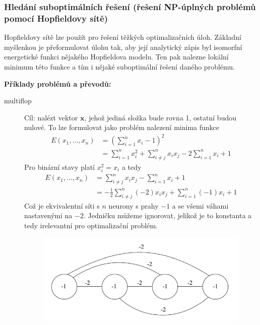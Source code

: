 \documentclass[11pt]{report} %
\renewcommand{\vec}[1]{\mathbf{#1}}
\numberwithin{equation}{section}
\begin{document}
\subsubsection{Hledání suboptimálních řešení (řešení NP-úplných problémů pomocí Hopfieldovy sítě)}
Hopfieldovy sítě lze použít pro řešení těžkých optimalizačních úloh. Základní myšlenkou je přeformulovat úlohu tak, aby její analytický zápis byl isomorfní energetické funkci nějakého Hopfieldova modelu. Ten pak nalezne lokální minimum této funkce a tím i nějaké suboptimální řešení daného problému.

\textbf{Příklady problémů a převodů:}
\begin{description}
	
	
	\item[multiflop] Cíl: nalézt vektor $\vec{x}$, jehož jediná složka bude rovna 1, ostatní budou nulové. To lze formulovat jako problém nalezení minima funkce
	\begin{align*}
		E(x_1, \dots,x_n) &= \left(\sum\limits_{i=1}^{n} x_i - 1\right)^2		\\
		&=\sum\limits_{i=1}^{n} x_i^2 + \sum\limits_{i\neq j}^{n} x_i x_j - 2\sum\limits_{i=1}^{n} x_i + 1
	\end{align*}
	Pro binární stavy platí $x_i^2 = x_i$ a tedy
	\begin{align*}
	E(x_1, \dots,x_n) &= \sum\limits_{i\neq j}^{n} x_i x_j - \sum\limits_{i=1}^{n} x_i + 1\\
	&= -\frac{1}{2}\sum\limits_{i\neq j}^{n} (-2)x_i x_j + \sum\limits_{i=1}^{n} (-1)x_i + 1
	\end{align*}
	Což je ekvivalentní síti s $n$ neurony s prahy $-1$ a se všemi váhami nastavenými na $-2$. Jedničku můžeme ignorovat, jelikož je to konstanta a tedy irelevantní pro optimalizační problém.
	
	\begin{figure}[H]
		\centering
		\includegraphics[scale=0.6]{img/multiflop.pdf}
	\end{figure}


\end{description}
\end{document}
